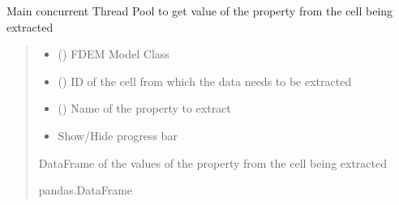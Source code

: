 \documentclass[letterpaper,10pt,english]{sphinxmanual}
\begin{document}

\begin{fulllineitems}
\label{\detokenize{openfdem:openfdem.extract_cell_thread_pool_generators.main}}
\pysigstartsignatures
{}
\pysigstopsignatures
\sphinxAtStartPar
Main concurrent Thread Pool to get value of the property from the cell being extracted
\begin{quote}\begin{description}
\begin{itemize}
\item {} 
\sphinxAtStartPar
{} ({\hyperref[\detokenize{openfdem:openfdem.openfdem.Model}]{}}) \textendash{} FDEM Model Class

\item {} 
\sphinxAtStartPar
{} () \textendash{} ID of the cell from which the data needs to be extracted

\item {} 
\sphinxAtStartPar
{} (\sphinxstyleliteralemphasis{\sphinxupquote{{[}}}\sphinxstyleliteralemphasis{\sphinxupquote{{]}}}) \textendash{} Name of the property to extract

\item {} 
\sphinxAtStartPar
{} \textendash{} Show/Hide progress bar

\end{itemize}

\sphinxAtStartPar
DataFrame of the values of the property from the cell being extracted

\sphinxAtStartPar
pandas.DataFrame

\end{description}\end{quote}

\end{fulllineitems}
\end{document}

